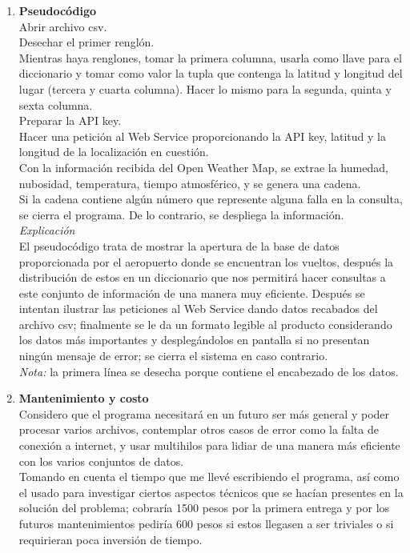 \documentclass[12pt]{article}
\begin{document}
\begin{enumerate}
	\item \textbf {Pseudocódigo}\\
	Abrir archivo csv.\\
	Desechar el primer renglón.\\
	Mientras haya renglones, tomar la primera columna, usarla como llave para el diccionario y tomar como valor la tupla que contenga la latitud y longitud del lugar (tercera y cuarta columna). Hacer lo mismo para la segunda, quinta y sexta columna.\\
	Preparar la API key.\\
	Hacer una petición al Web Service proporcionando la API key, latitud y la longitud de la localización en cuestión.\\
	Con la información recibida del Open Weather Map, se extrae la humedad, nubosidad, temperatura, tiempo atmosférico, y se genera una cadena.\\
	Si la cadena contiene algún número que represente alguna falla en la consulta, se cierra el programa. De lo contrario, se despliega la información.\\
	{\it Explicación}\\
	El pseudocódigo trata de mostrar la apertura de la base de datos proporcionada por el aeropuerto donde se encuentran los vueltos, después la distribución de estos en un diccionario que nos permitirá hacer consultas a este conjunto de información de una manera muy eficiente. Después se intentan ilustrar las peticiones al Web Service dando datos recabados del archivo csv; finalmente se le da un formato legible al producto considerando los datos más importantes y desplegándolos en pantalla si no presentan ningún mensaje de error; se cierra el sistema en caso contrario.\\
	{\it Nota: } la primera línea se desecha porque contiene el encabezado de los datos.
	
	\item \textbf {Mantenimiento y costo}\\
	Considero que el programa necesitará en un futuro ser más general y poder procesar varios archivos, contemplar otros casos de error como la falta de conexión a internet, y usar multihilos para lidiar de una manera más eficiente con los varios conjuntos de datos.\\Tomando en cuenta el tiempo que me llevé escribiendo el programa, así como el usado para investigar ciertos aspectos técnicos que se hacían presentes en la solución del problema; cobraría 1500 pesos por la primera entrega y por los futuros mantenimientos pediría 600 pesos si estos llegasen a ser triviales o si requirieran poca inversión de tiempo.
	\end{enumerate}
\end{document}
